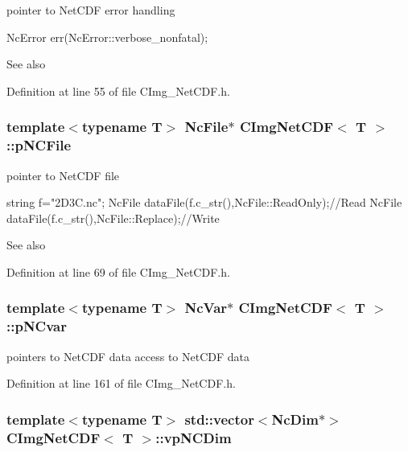 pointer to NetCDF error handling 
\begin{DoxyCode}
   NcError err(NcError::verbose_nonfatal);
\end{DoxyCode}


\begin{DoxySeeAlso}{See also}

\end{DoxySeeAlso}


Definition at line 55 of file CImg\_\-NetCDF.h.\hypertarget{classCImgNetCDF_afc1258a75770925f6646a4291257e8f7}{
\subsubsection[{pNCFile}]{\setlength{\rightskip}{0pt plus 5cm}template$<$typename T$>$ NcFile$\ast$ {\bf CImgNetCDF}$<$ T $>$::{\bf pNCFile}}}
\label{classCImgNetCDF_afc1258a75770925f6646a4291257e8f7}


pointer to NetCDF file 
\begin{DoxyCode}
   string f="2D3C.nc";
   NcFile dataFile(f.c_str(),NcFile::ReadOnly);//Read
   NcFile dataFile(f.c_str(),NcFile::Replace);//Write
\end{DoxyCode}


\begin{DoxySeeAlso}{See also}

\end{DoxySeeAlso}


Definition at line 69 of file CImg\_\-NetCDF.h.\hypertarget{classCImgNetCDF_a2075c35a87dadc9868f8a2a8b46ca833}{
\subsubsection[{pNCvar}]{\setlength{\rightskip}{0pt plus 5cm}template$<$typename T$>$ NcVar$\ast$ {\bf CImgNetCDF}$<$ T $>$::{\bf pNCvar}}}
\label{classCImgNetCDF_a2075c35a87dadc9868f8a2a8b46ca833}


pointers to NetCDF data access to NetCDF data


\begin{DoxyCode}
\end{DoxyCode}
 

Definition at line 161 of file CImg\_\-NetCDF.h.\hypertarget{classCImgNetCDF_acfe94f6cb56b1d1b8eea947473b4ce8c}{
\subsubsection[{vpNCDim}]{\setlength{\rightskip}{0pt plus 5cm}template$<$typename T$>$ std::vector$<$NcDim$\ast$$>$ {\bf CImgNetCDF}$<$ T $>$::{\bf vpNCDim}}}
\label{classCImgNetCDF_acfe94f6cb56b1d1b8eea947473b4ce8c}


